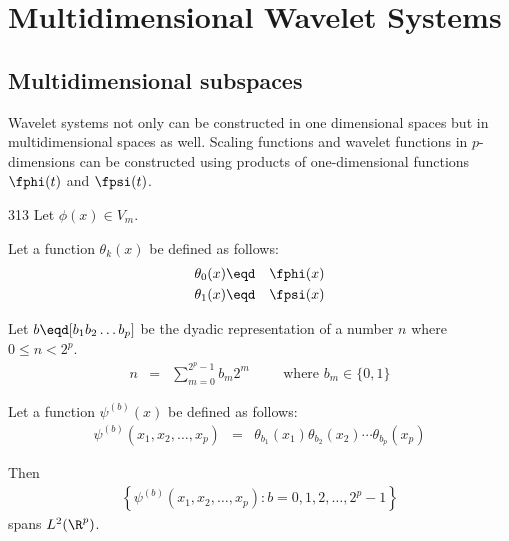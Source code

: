 
\chapter{Multidimensional Wavelet Systems}
\label{app:3d}
 
\section {Multidimensional subspaces}
Wavelet systems not only can be constructed in one dimensional spaces
but in multidimensional spaces as well.
Scaling functions and wavelet functions in $p$-dimensions can be constructed 
using products of one-dimensional functions $\fphi(t)$ and $\fpsi(t)$.


\begin{theorem}
\label{thm:pdim}
\citep{mallat}{313}
Let $\phi(x)\in V_m$.

Let a function $\theta_k(x)$ be defined as follows:
\begin{eqnarray*}
   \theta_0(x) &\eqd& \fphi(x) \\
   \theta_1(x) &\eqd& \fpsi(x) 
\end{eqnarray*}

Let $b\eqd [b_{1} b_{2} \ldots b_p ]$ be the dyadic representation of a number
$n$ where $0\le n < 2^p$.
\begin{eqnarray*}
   n &=& \sum\limits_{m=0}^{2^p-1} b_m 2^m
   \hspace{1cm}\mbox{where }b_m \in \{0,1\}
\end{eqnarray*}

Let a function $\psi^{(b)}(x)$ be defined as follows:
\begin{eqnarray*}
   \psi^{(b)}(x_1, x_2, \ldots, x_p) &=& 
   \theta_{b_1}(x_1)\theta_{b_{2}}(x_2)\cdots\theta_{b_p}(x_p) 
\end{eqnarray*}

Then 
\begin{eqnarray*}
   \left\{
      \psi^{(b)}(x_1, x_2, \ldots, x_p) : b=0,1,2,\ldots, 2^p-1
   \right\}
\end{eqnarray*}
spans $L^2(\R^p)$.
\end{theorem}

